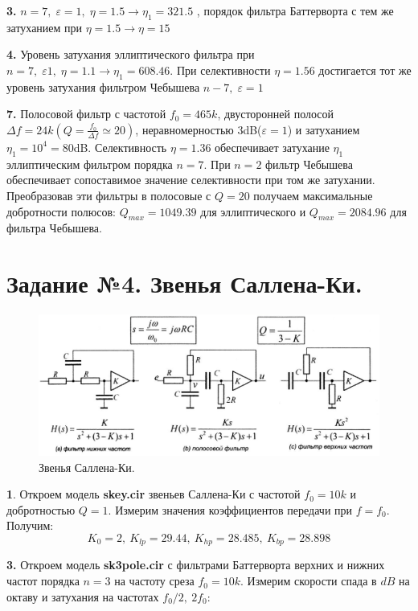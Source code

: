 \documentclass[a4paper, 12pt, twoside]{article}
\begin{document}
\textbf{3.} $ n=7,\; \varepsilon=1,\; \eta=1.5\rightarrow\eta_1=321.5 $ , порядок фильтра Баттерворта с тем же затуханием при $ \eta =1.5 \rightarrow \eta=15 $

\textbf{4.} Уровень затухания эллиптического фильтра при $ n=7,\;\varepsilon1,\;\eta=1.1 \rightarrow \eta_1=608.46 $. При селективности $ \eta=1.56  $ достигается тот же уровень затухания фильтром Чебышева $ n-7,\;\varepsilon=1 $

\textbf{7.} Полосовой фильтр с частотой $ f_0=465k $, двусторонней полосой $ \Delta f = 24k\left(Q=\frac{f_0}{\Delta f}\simeq20\right) $, неравномерностью 3dB($ \varepsilon=1 $) и затуханием $ \eta_1=10^4=80 $dB. Селективность $ \eta=1.36 $ обеспечивает затухание $ \eta_1 $ эллиптическим фильтром порядка $ n=7 $. При $ n=2 $ фильтр Чебышева обеспечивает сопоставимое значение селективности при том же затухании. Преобразовав эти фильтры в полосовые с $ Q=20 $ получаем максимальные добротности полюсов: $ Q_{max} = 1049.39 $ для эллиптического и $ Q_{max} = 2084.96 $ для фильтра Чебышева.

\newpage

\section*{Задание №4. Звенья Саллена-Ки.}

\begin{figure}[H]
	\centering
	\includegraphics[width =  0.9\linewidth]{zvsk}
	\caption{Звенья Саллена-Ки.}
	\label{nus}
\end{figure}

\textbf{1}. Откроем модель \textbf{skey.cir} звеньев Саллена-Ки с частотой $f_0 = 10k$ и добротностью $Q = 1$. Измерим значения коэффициентов передачи при $f = f_0$. Получим:
$$K_0 = 2,~K_{lp} = 29.44,~ K_{hp} = 28.485,~K_{bp} = 28.898$$

\textbf{3.} Откроем модель \textbf{sk3pole.cir} с фильтрами Баттерворта верхних и нижних частот порядка $n = 3$ на частоту среза $f_0 = 10k$. Измерим скорости спада в $dB$ на октаву и затухания на частотах $f_0/2, ~ 2f_0$:
\end{document}
